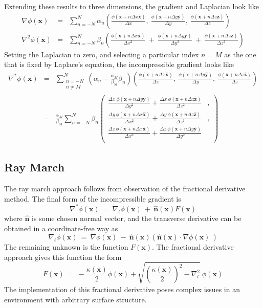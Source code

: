 \documentclass{article}
\def\xvec{\textbf{x}}
\def\nhat{\hat{\textbf{n}}}
\def\dx{\Delta x}
\def\dy{\Delta y}
\def\inabla{\nabla^{*}}
\def\dx{\Delta x}
\def\dy{\Delta y}
\def\dz{\Delta z}
\def\xhat{\hat{\textbf{x}}}
\def\yhat{\hat{\textbf{y}}}
\def\zhat{\hat{\textbf{z}}}
\begin{document}
Extending these results to three dimensions, the gradient and Laplacian look like
\begin{eqnarray}
\nabla\phi(\xvec) &=& \sum_{n=-N}^N \alpha_n\left( \frac{\phi(\xvec+n\dx\xhat)}{\dx},\   \frac{\phi(\xvec+n\dy\yhat)}{\dy},\  \frac{\phi(\xvec+n\dz\zhat)}{\dz} \right) \\
\nabla^2 \phi(\xvec) &=&  \sum_{n=-N}^N \beta_n\left(  \frac{\phi(\xvec+n\dx\xhat)}{\dx^2}\ +\  \frac{\phi(\xvec+n\dy\yhat)}{\dy^2}\ +\  \frac{\phi(\xvec+n\dz\zhat)}{\dz^2}       \right)
\end{eqnarray}
Setting the Laplacian to zero, and selecting a particular index $n=M$ as the one that is fixed by Laplace's equation, the incompressible gradient looks like
\begin{eqnarray}
\inabla\phi(\xvec) &=& \sum_{ \begin{array}{c} n=-N \\ n \neq M\end{array} }^{N} \left( \alpha_n-\frac{\alpha_M}{\beta_M}\beta_n  \right) \left( \frac{\phi(\xvec+n\dx\xhat)}{\dx},\   \frac{\phi(\xvec+n\dy\yhat)}{\dy},\  \frac{\phi(\xvec+n\dz\zhat)}{\dz} \right) \nonumber \\
&-& \frac{\alpha_M}{\beta_M}\sum_{n=-N}^N \beta_n \left( 
      \begin{array}{cl} 
           \frac{\dx\ \phi(\xvec+n\dy\yhat)}{\dy^2} +  \frac{\dx\ \phi(\xvec+n\dz\zhat)}{\dz^2} &, \\
           \frac{\dy\ \phi(\xvec+n\dx\xhat)}{\dx^2} +  \frac{\dy\ \phi(\xvec+n\dz\zhat)}{\dz^2} &, \\
           \frac{\dz\ \phi(\xvec+n\dx\xhat)}{\dx^2} +  \frac{\dz\ \phi(\xvec+n\dy\yhat)}{\dy^2} & \\
      \end{array}
  \right)   
\end{eqnarray}


\subsection{Ray March}

The ray march approach follows from observation of the fractional derivative method.  The final form of the incompressible gradient is 
\begin{equation}
\inabla\phi(\xvec) \ =\ \nabla_t\phi(\xvec) \ +\ \nhat(\xvec) F(\xvec)
\end{equation}
where $\nhat$ is some chosen normal vector, and the transverse derivative can be obtained in a coordinate-free way as
\begin{equation}
\nabla_t\phi(\xvec) \ =\ \nabla\phi(\xvec) \ -\ \nhat(\xvec)\left( \nhat(\xvec)\cdot\nabla\phi(\xvec)\ \right)
\end{equation}
The remaining unknown is the function $F(\xvec)$.  The fractional derivative approach gives this function the form
\begin{equation}
F(\xvec) \ =\  -\frac{\kappa(\xvec)}{2}\phi(\xvec) + \sqrt{\left(\frac{\kappa(\xvec)}{2}\right)^2 -\nabla_t^2}\ \phi(\xvec)
\end{equation}
The implementation of this fractional derivative poses complex issues in an environment with arbitrary surface structure.
\end{document}
